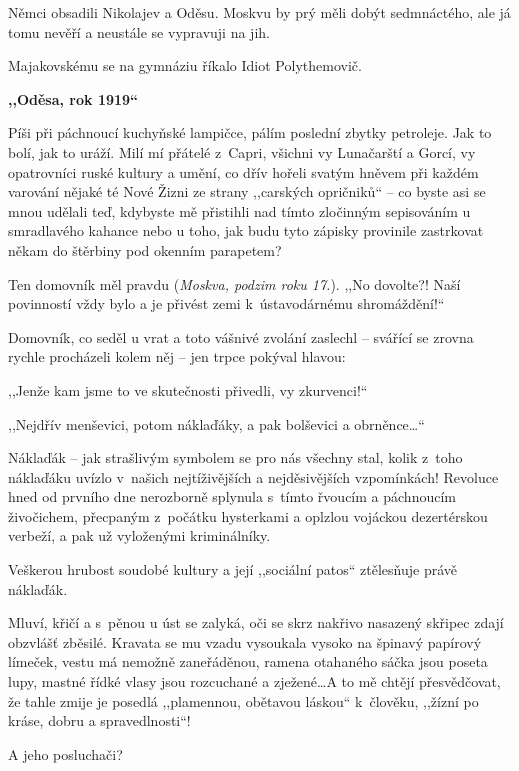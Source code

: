 \noindent
Němci obsadili Nikolajev a Oděsu. Moskvu by prý měli dobýt sedmnáctého, ale já tomu nevěří a neustále se vypravuji na jih.

Majakovskému se na gymnáziu říkalo Idiot Polythemovič.

\bigskip

\noindent
\textbf{,,Oděsa, rok 1919``}

\medskip

\noindent
Píši při páchnoucí kuchyňské lampičce, pálím poslední zbytky petroleje. Jak to bolí, jak to uráží. Milí mí přátelé z Capri, všichni vy Lunačarští a Gorcí, vy opatrovníci ruské kultury a umění, co dřív hořeli svatým hněvem při každém varování nějaké té Nové Žizni ze strany ,,carských opričniků`` -- co byste asi se mnou udělali teď, kdybyste mě přistihli nad tímto zločinným sepisováním u smradlavého kahance nebo u toho, jak budu tyto zápisky provinile zastrkovat někam do štěrbiny pod okenním parapetem?

Ten domovník měl pravdu (\textit{Moskva, podzim roku 17.}).
,,No dovolte?! Naší povinností vždy bylo a je přivést zemi k ústavodárnému shromáždění!``

Domovník, co seděl u vrat a toto vášnivé zvolání zaslechl -- svářící se zrovna rychle procházeli kolem něj -- jen trpce pokýval hlavou:

,,Jenže kam jsme to ve skutečnosti přivedli, vy zkurvenci!``

,,Nejdřív menševici, potom náklaďáky, a pak bolševici a obrněnce\ldots``

Náklaďák -- jak strašlivým symbolem se pro nás všechny stal, kolik z toho náklaďáku uvízlo v našich nejtíživějších a nejděsivějších vzpomínkách! Revoluce hned od prvního dne nerozborně splynula s tímto řvoucím a páchnoucím živočichem, přecpaným z počátku hysterkami a oplzlou vojáckou dezertérskou verbeží, a pak už vyloženými kriminálníky.

Veškerou hrubost soudobé kultury a její ,,sociální patos`` ztě\-les\-ňuje právě náklaďák.

Mluví, křičí a s pěnou u úst se zalyká, oči se skrz nakřivo nasazený skřipec zdají obzvlášť zběsilé. Kravata se mu vzadu vysoukala vysoko na špinavý papírový límeček, vestu má nemožně zaneřáděnou, ramena otahaného sáčka jsou poseta lupy, mastné řídké vlasy jsou rozcuchané a zježené\ldots A to mě chtějí přesvědčovat, že tahle zmije je posedlá ,,plamennou, obětavou láskou`` k člověku, ,,žízní po kráse, dobru a spravedlnosti``! 

A jeho posluchači?


